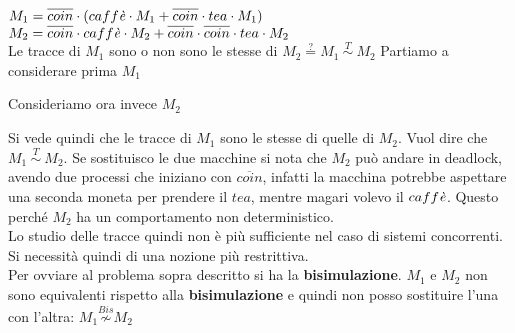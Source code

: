 $M_1 = \overline{coin} \cdot (caff\textnormal{\textit{è}} \cdot M_1 + \overline{coin} \cdot tea \cdot M_1)$ \\
$M_2 = \overline{coin} \cdot caff\textnormal{\textit{è}} \cdot M_2 + \overline{coin} \cdot \overline{coin} \cdot tea \cdot M_2$ \\
Le tracce di $M_1$ sono o non sono le stesse di $M_2\stackrel{?}{=} M_1 \ \stackrel{T}{\sim} \ M_2$
Partiamo a considerare prima $M_1$
 \begin{center}
  \end{center}
Consideriamo ora invece $M_2$
\begin{center}
\end{center}

Si vede quindi che le tracce di $M_1$ sono le stesse di quelle di $M_2$. Vuol dire che $M_1 \ \stackrel{T}{\sim} \ M_2$. Se sostituisco le due macchine si nota che $M_2$ può andare in deadlock, avendo due processi che iniziano con $\overline{coin}$, infatti la macchina potrebbe aspettare una seconda moneta per prendere il $tea$, mentre magari volevo il $caff\textnormal{\textit{è}}$. Questo perché $M_2$ ha un comportamento non deterministico. \\

Lo studio delle tracce quindi non è più sufficiente nel caso di sistemi concorrenti. Si necessità quindi di una nozione più restrittiva.\\ Per ovviare al problema sopra descritto si ha la \textbf{bisimulazione}. 
$M_1$ e $M_2$ non sono equivalenti rispetto alla \textbf{bisimulazione} e quindi non posso sostituire l'una con l'altra: $M_1\stackrel{Bis}{\not\sim}M_2$